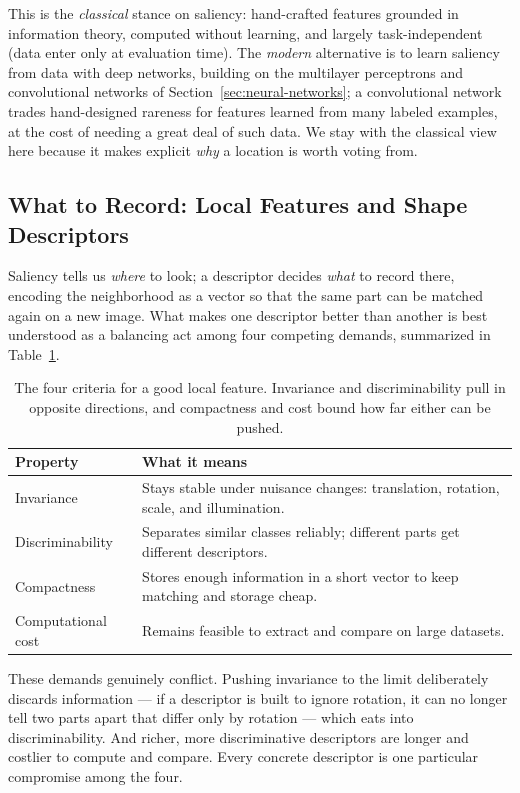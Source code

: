 This is the \emph{classical} stance on saliency: hand-crafted features grounded in
information theory, computed without learning, and largely task-independent (data
enter only at evaluation time). The \emph{modern} alternative is to learn saliency
from data with deep networks, building on the multilayer perceptrons and
convolutional networks of Section~\ref{sec:neural-networks}; a convolutional
network trades hand-designed rareness for features learned from many labeled
examples, at the cost of needing a great deal of such data. We stay with the
classical view here because it makes explicit \emph{why} a location is worth voting
from.

\subsection{What to Record: Local Features and Shape Descriptors}

Saliency tells us \emph{where} to look; a descriptor decides \emph{what} to record
there, encoding the neighborhood as a vector so that the same part can be matched
again on a new image. What makes one descriptor better than another is best
understood as a balancing act among four competing demands, summarized in
Table~\ref{tab:feature-criteria}.

\begin{table}[ht]
  \centering
  \begin{tabular}{@{}p{3.0cm}p{10.5cm}@{}}
    \toprule
    Property & What it means \\
    \midrule
    Invariance & Stays stable under nuisance changes: translation, rotation,
      scale, and illumination. \\
    Discriminability & Separates similar classes reliably; different parts get
      different descriptors. \\
    Compactness & Stores enough information in a short vector to keep matching
      and storage cheap. \\
    Computational cost & Remains feasible to extract and compare on large
      datasets. \\
    \bottomrule
  \end{tabular}
  \caption{The four criteria for a good local feature. Invariance and
  discriminability pull in opposite directions, and compactness and cost bound
  how far either can be pushed.}
  \label{tab:feature-criteria}
\end{table}

\noindent
These demands genuinely conflict. Pushing invariance to the limit deliberately
discards information --- if a descriptor is built to ignore rotation, it can no
longer tell two parts apart that differ only by rotation --- which eats into
discriminability. And richer, more discriminative descriptors are longer and
costlier to compute and compare. Every concrete descriptor is one particular
compromise among the four.

